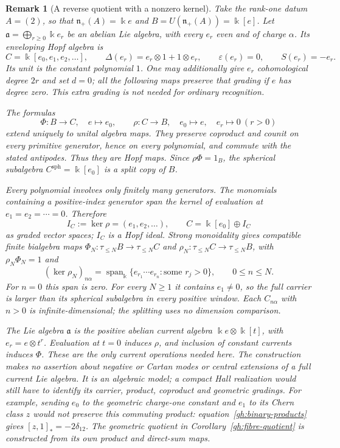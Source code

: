 \documentclass[11pt]{article}
\newtheorem{remark}[theorem]{Remark}
\newcommand{\kk}{\Bbbk}
\begin{document}
\begin{remark}[A reverse quotient with a nonzero kernel]
\label{current-quotient-example}
Take the rank-one datum $A=(2)$, so that
$\mathfrak n_+(A)=\kk e$ and $B=U(\mathfrak n_+(A))=\kk[e]$.
Let $\mathfrak a=\bigoplus_{r\geq0}\kk e_r$ be an abelian Lie algebra,
with every $e_r$ even and of charge $\alpha$. Its enveloping Hopf algebra is
\[
 C=\kk[e_0,e_1,e_2,\ldots],\qquad
 \Delta(e_r)=e_r\otimes1+1\otimes e_r,\qquad
 \varepsilon(e_r)=0,\qquad S(e_r)=-e_r.
\]
Its unit is the constant polynomial $1$.
One may additionally give $e_r$ cohomological degree $2r$ and set $d=0$;
all the following maps preserve that grading if $e$ has degree zero.
This extra grading is not needed for ordinary recognition.

The formulas
\begin{equation}
 \Phi:B\longrightarrow C,\quad e\longmapsto e_0,
 \qquad
 \rho:C\longrightarrow B,\quad
 e_0\longmapsto e,\quad e_r\longmapsto0\ (r>0)
 \label{current-retraction}
\end{equation}
extend uniquely to unital algebra maps. They preserve coproduct and
counit on every primitive generator, hence on every polynomial, and
commute with the stated antipodes. Thus they are Hopf maps.
Since $\rho\Phi=1_B$, the spherical subalgebra $C^{\mathrm{sph}}=\kk[e_0]$
is a split copy of $B$.

Every polynomial involves only finitely many generators. The monomials
containing a positive-index generator span the kernel of evaluation at
$e_1=e_2=\cdots=0$. Therefore
\begin{equation}
 I_C:=\ker\rho=(e_1,e_2,\ldots),\qquad
 C=\kk[e_0]\oplus I_C
 \label{current-kernel}
\end{equation}
as graded vector spaces; $I_C$ is a Hopf ideal.
Strong monoidality gives compatible finite bialgebra maps
$\Phi_N:\tau_{\leq N}B\to\tau_{\leq N}C$ and
$\rho_N:\tau_{\leq N}C\to\tau_{\leq N}B$, with
$\rho_N\Phi_N=1$ and
\[
 (\ker\rho_N)_{n\alpha}
 =\operatorname{span}_{\kk}\{
 e_{r_1}\cdots e_{r_n}:\text{some }r_j>0\},\qquad 0\leq n\leq N.
\]
For $n=0$ this span is zero. For every $N\geq1$ it contains
$e_1\neq0$, so the full carrier is larger than its spherical subalgebra
in every positive window. Each $C_{n\alpha}$ with $n>0$ is
infinite-dimensional; the splitting uses no dimension comparison.

The Lie algebra $\mathfrak a$ is the positive abelian current algebra
$\kk e\otimes\kk[t]$, with $e_r=e\otimes t^r$.
Evaluation at $t=0$ induces $\rho$, and inclusion of constant currents
induces $\Phi$. These are the only current operations needed here.
The construction makes no assertion about negative or Cartan modes or
central extensions of a full current Lie algebra. It is an algebraic
model; a compact Hall realization would still have to identify its
carrier, product, coproduct and geometric gradings.
For example, sending $e_0$ to the geometric charge-one constant
and $e_1$ to its Chern class $z$ would not preserve this commuting
product: equation~\eqref{gh:binary-products} gives
$[z,1]_*=-2\delta_{12}$.
The geometric quotient in Corollary~\ref{gh:fibre-quotient} is
constructed from its own product and direct-sum maps.
\end{remark}
\end{document}
